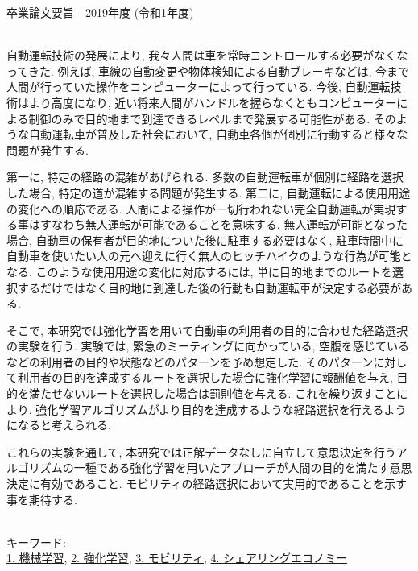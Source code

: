 卒業論文要旨 - 2019年度 (令和1年度)
\begin{center}
\begin{large}
\end{large}
\end{center}

~ \\

自動運転技術の発展により, 我々人間は車を常時コントロールする必要がなくなってきた.
例えば, 車線の自動変更や物体検知による自動ブレーキなどは, 今まで人間が行っていた操作をコンピューターによって行っている.
今後, 自動運転技術はより高度になり, 近い将来人間がハンドルを握らなくともコンピューターによる制御のみで目的地まで到達できるレベルまで発展する可能性がある.
そのような自動運転車が普及した社会において, 自動車各個が個別に行動すると様々な問題が発生する.

第一に, 特定の経路の混雑があげられる.
多数の自動運転車が個別に経路を選択した場合, 特定の道が混雑する問題が発生する.
第二に, 自動運転による使用用途の変化への順応である. 人間による操作が一切行われない完全自動運転が実現する事はすなわち無人運転が可能であることを意味する.
無人運転が可能となった場合, 自動車の保有者が目的地についた後に駐車する必要はなく, 駐車時間中に自動車を使いたい人の元へ迎えに行く無人のヒッチハイクのような行為が可能となる.
このような使用用途の変化に対応するには, 単に目的地までのルートを選択するだけではなく目的地に到達した後の行動も自動運転車が決定する必要がある.

そこで, 本研究では強化学習を用いて自動車の利用者の目的に合わせた経路選択の実験を行う.
実験では, 緊急のミーティングに向かっている, 空腹を感じているなどの利用者の目的や状態などのパターンを予め想定した. そのパターンに対して利用者の目的を達成するルートを選択した場合に強化学習に報酬値を与え, 目的を満たせないルートを選択した場合は罰則値を与える.
これを繰り返すことにより, 強化学習アルゴリズムがより目的を達成するような経路選択を行えるようになると考えられる.

これらの実験を通して, 本研究では正解データなしに自立して意思決定を行うアルゴリズムの一種である強化学習を用いたアプローチが人間の目的を満たす意思決定に有効であること. モビリティの経路選択において実用的であることを示す事を期待する.

~ \\
キーワード:\\
\underline{1. 機械学習},
\underline{2. 強化学習},
\underline{3. モビリティ},
\underline{4. シェアリングエコノミー}
\begin{flushright}
\dept \\
\author
\end{flushright}
